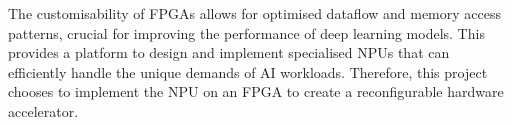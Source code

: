 \documentclass[12pt, a4paper, ukenglish]{article}
\begin{document}
    The customisability of FPGAs allows for optimised dataflow and memory access patterns, crucial for improving the performance of deep learning models. This provides a platform to design and implement specialised NPUs that can efficiently handle the unique demands of AI workloads. Therefore, this project chooses to implement the NPU on an FPGA to create a reconfigurable hardware accelerator. 

    


    
\end{document}
